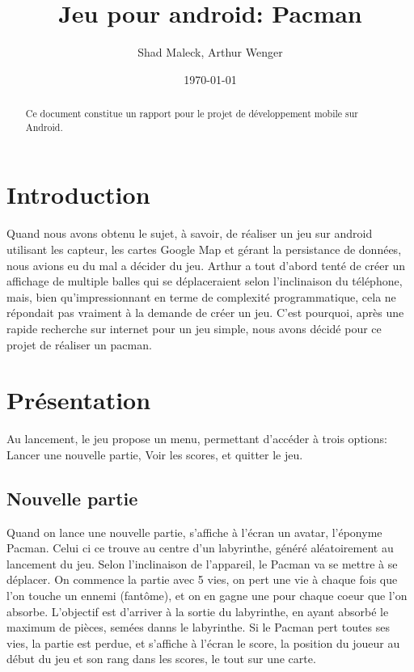 \documentclass{article}
\title{Jeu pour android: Pacman}
\author{Shad Maleck, Arthur Wenger}
\date{\today}
\begin{document}
\maketitle %


\begin{abstract}
  Ce document constitue un rapport pour le projet de développement mobile sur Android.
\end{abstract}

\section{Introduction}
\label{section:intro} %

Quand nous avons obtenu le sujet, à savoir, de réaliser un jeu sur android utilisant les capteur, les cartes Google Map et gérant la persistance de données, nous avions eu du mal a décider du jeu. 
Arthur a tout d'abord tenté de créer un affichage de multiple balles qui se déplaceraient selon l'inclinaison du téléphone, mais, bien qu'impressionnant en terme de complexité programmatique, cela ne répondait pas vraiment à la demande de créer un jeu.
C'est pourquoi, après une rapide recherche sur internet pour un jeu simple, nous avons décidé pour ce projet de réaliser un pacman.

\section{Présentation}
\label{section:presentation}
Au lancement, le jeu propose un menu, permettant d'accéder à trois options: Lancer une nouvelle partie, Voir les scores, et quitter le jeu.

\subsection{Nouvelle partie}
\label{subsection:1_1}
Quand on lance une nouvelle partie, s'affiche à l'écran un avatar, l'éponyme Pacman.
Celui ci ce trouve au centre d'un labyrinthe, généré aléatoirement au lancement du jeu.
Selon l'inclinaison de l'appareil, le Pacman va se mettre à se déplacer.
On commence la partie avec 5 vies, on pert une vie à chaque fois que l'on touche un ennemi (fantôme), et on en gagne une pour chaque coeur que l'on absorbe.
L'objectif est d'arriver à la sortie du labyrinthe, en ayant absorbé le maximum de pièces, semées danns le labyrinthe.
Si le Pacman pert toutes ses vies, la partie est perdue, et s'affiche à l'écran le score, la position du joueur au début du jeu et son rang dans les scores, le tout sur une carte.
\end{document}
